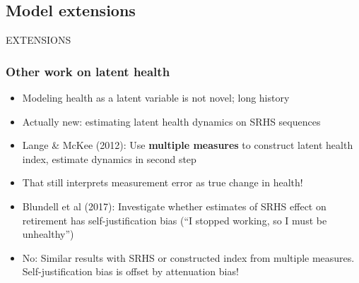 \documentclass[aspectratio=169]{beamer}
\begin{document}
\subsection{Model extensions}


\begin{frame}
\begin{center}
	\Huge
	EXTENSIONS
\end{center}
\end{frame}


\begin{frame}\frametitle{Other work on latent health}
\begin{itemize}
	\item <1->Modeling health as a latent variable is not novel; long history
	
	\item <1->Actually new: estimating latent health dynamics on SRHS sequences
	
	\item <2->Lange \& McKee (2012): Use \textbf{multiple measures} to construct latent health index, estimate dynamics in second step
	
	\item <3->That still interprets measurement error as true change in health!
	
	\item <4->Blundell et al (2017): Investigate whether estimates of SRHS effect on retirement has self-justification bias (``I stopped working, so I must be unhealthy'')
	
	\item <5->No: Similar results with SRHS or constructed index from multiple measures.  Self-justification bias is offset by attenuation bias!
\end{itemize}
\end{frame}
\end{document}
